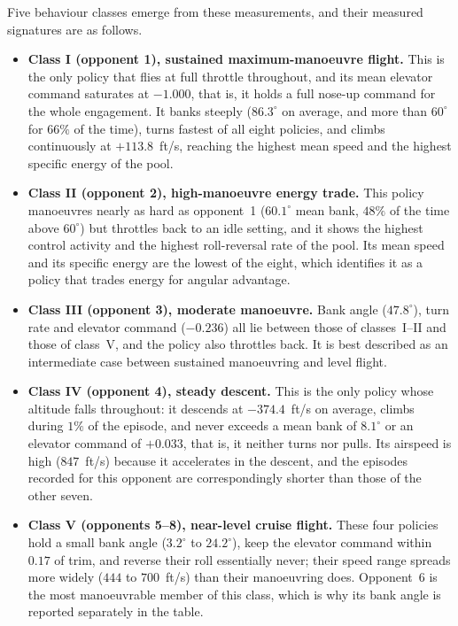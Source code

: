 \documentclass[pdflatex,sn-mathphys-num]{sn-jnl}%
\theoremstyle{thmstyleone}%
\theoremstyle{thmstyletwo}%
\theoremstyle{thmstylethree}%
\begin{document}
Five behaviour classes emerge from these measurements, and their measured signatures are as follows.

\begin{itemize}
    \item \textbf{Class I (opponent 1), sustained maximum-manoeuvre flight.} This is the only policy that flies at full throttle throughout, and its mean elevator command saturates at $-1.000$, that is, it holds a full nose-up command for the whole engagement. It banks steeply ($86.3^{\circ}$ on average, and more than $60^{\circ}$ for $66\%$ of the time), turns fastest of all eight policies, and climbs continuously at $+113.8$~ft/s, reaching the highest mean speed and the highest specific energy of the pool.
    \item \textbf{Class II (opponent 2), high-manoeuvre energy trade.} This policy manoeuvres nearly as hard as opponent~1 ($60.1^{\circ}$ mean bank, $48\%$ of the time above $60^{\circ}$) but throttles back to an idle setting, and it shows the highest control activity and the highest roll-reversal rate of the pool. Its mean speed and its specific energy are the lowest of the eight, which identifies it as a policy that trades energy for angular advantage.
    \item \textbf{Class III (opponent 3), moderate manoeuvre.} Bank angle ($47.8^{\circ}$), turn rate and elevator command ($-0.236$) all lie between those of classes~I--II and those of class~V, and the policy also throttles back. It is best described as an intermediate case between sustained manoeuvring and level flight.
    \item \textbf{Class IV (opponent 4), steady descent.} This is the only policy whose altitude falls throughout: it descends at $-374.4$~ft/s on average, climbs during $1\%$ of the episode, and never exceeds a mean bank of $8.1^{\circ}$ or an elevator command of $+0.033$, that is, it neither turns nor pulls. Its airspeed is high ($847$~ft/s) because it accelerates in the descent, and the episodes recorded for this opponent are correspondingly shorter than those of the other seven.
    \item \textbf{Class V (opponents 5--8), near-level cruise flight.} These four policies hold a small bank angle ($3.2^{\circ}$ to $24.2^{\circ}$), keep the elevator command within $0.17$ of trim, and reverse their roll essentially never; their speed range spreads more widely ($444$ to $700$~ft/s) than their manoeuvring does. Opponent~6 is the most manoeuvrable member of this class, which is why its bank angle is reported separately in the table.
\end{itemize}
\end{document}
